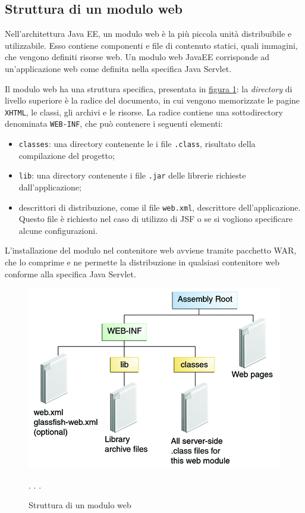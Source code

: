 \subsection{Struttura di un modulo web}
Nell'architettura Java EE, un modulo web è la più piccola unità distribuibile e utilizzabile. Esso contiene componenti e file di contenuto statici, quali immagini, che vengono definiti risorse web. Un modulo web JavaEE corrisponde ad un'applicazione web come definita nella specifica Java Servlet.

Il modulo web ha una struttura specifica, presentata in \hyperref[fig:javaee-modulo]{figura \ref{fig:javaee-modulo}}: la \textit{directory} di livello superiore è la radice del documento, in cui vengono memorizzate le pagine \texttt{XHTML}, le classi, gli archivi e le risorse. La radice contiene una sottodirectory denominata \texttt{WEB-INF}, che può contenere i seguenti elementi:
\begin{itemize}
	\item \texttt{classes}: una directory contenente le i file \texttt{.class}, risultato della compilazione del progetto;
	\item \texttt{lib}: una directory contenente i file \texttt{.jar} delle librerie richieste dall'applicazione;
	\item descrittori di distribuzione, come il file \texttt{web.xml}, descrittore dell'applicazione. Questo file è richiesto nel caso di utilizzo di JSF o se si vogliono specificare alcune configurazioni.
\end{itemize}

L'installazione del modulo nel contenitore web avviene tramite pacchetto WAR, che lo comprime e ne permette la distribuzione in qualsiasi contenitore web conforme alla specifica Java Servlet.

\begin{figure}
	\centering
	\includegraphics{Immagini/javaee-modulo.png}
	\caption{Struttura di un modulo web}
	\label{fig:javaee-modulo}
	\footnotesize{}. \citeauthor{bib:javaee-tutorial}. \citeyear{bib:javaee-tutorial}.
\end{figure}

